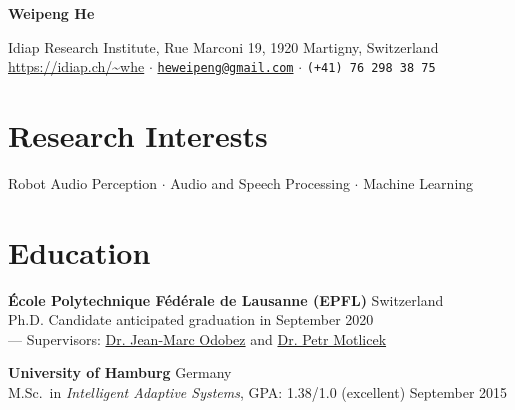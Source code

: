 \documentclass[a4paper,9pt]{article} %
\newcommand{\ind}{\hspace*{1em}}
\begin{document}
\thispagestyle{empty}


\begin{center}
  {\Huge\bfseries\sffamily Weipeng He}

  \sffamily Idiap Research Institute, Rue Marconi 19, 1920 Martigny, Switzerland \\
  \url{https://idiap.ch/~whe} $\cdotp$
  \href{mailto:heweipeng@gmail.com}{\texttt{heweipeng@gmail.com}} $\cdotp$
  \texttt{(+41) 76 298 38 75}
\end{center}


\section{Research Interests}
\begin{center}
Robot Audio Perception $\cdotp$ Audio and Speech Processing $\cdotp$ Machine Learning
\end{center}


\section{Education}
\textbf{\'Ecole Polytechnique F\'ed\'erale de Lausanne (EPFL)} \hfill Switzerland \\
\ind{} Ph.D. Candidate \hfill anticipated graduation in September 2020 \\
\ind{} --- Supervisors: \href{https://idiap.ch/~odobez}{Dr. Jean-Marc Odobez} and \href{https://people.idiap.ch/pmotlic}{Dr. Petr Motlicek}

\textbf{University of Hamburg} \hfill Germany \\
\ind{} M.Sc.\ in \textit{Intelligent Adaptive Systems}, GPA\@: 1.38/1.0 (excellent)  \hfill September 2015%
\end{document}
